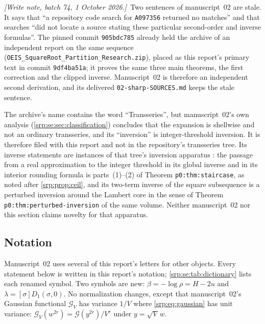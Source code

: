 \documentclass[11pt,a4paper]{article}
\numberwithin{equation}{section}
\theoremstyle{definition}
\theoremstyle{remark}
\newcommand{\G}{\mathcal G}
\newcommand{\writenotefour}[1]{\par\smallskip\noindent
 \textit{[Write note, batch 74, 1 October 2026.]}\ #1\par\smallskip}
\begin{document}
\writenotefour{Two sentences of manuscript~02 are stale. It says that ``a
repository code search for \texttt{A097356} returned no matches'' and
that searches ``did not locate a source stating these particular
second-order and inverse formulas''. The pinned commit
\texttt{905bdc785} already held the archive of an independent report on
the same sequence (\texttt{OEIS\_SquareRoot\_Partition\_Research.zip}),
placed as this report's primary text in commit \texttt{9df4ba51a}; it
proves the same three main theorems, the first correction and the clipped
inverse. Manuscript~02 is therefore an independent second derivation, and
its delivered \texttt{02-sharp-SOURCES.md} keeps the stale sentence.}

The archive's name contains the word ``Transseries'', but manuscript~02's
own analysis (\cref{srp:se:sec:classification}) concludes that the
expansion is shellwise and not an ordinary transseries, and its
``inversion'' is integer-threshold inversion. It is therefore filed with
this report and not in the repository's transseries tree. Its inverse
statements are instances of that tree's inversion apparatus
\cite{proveitTI}: the passage from a real approximation to the integer
threshold in its global inverse and in its interior rounding formula is
parts~(1)--(2) of Theorem \texttt{p0:thm:staircase}, as noted after
\cref{srp:prop:ceil}, and its two-term inverse of the square subsequence is
a perturbed inversion around the Lambert core in the sense of Theorem
\texttt{p0:thm:perturbed-inversion} of the same volume. Neither
manuscript~02 nor this section claims novelty for that apparatus.

\subsection{Notation}
\label{srp:se:sec:notation}

Manuscript~02 uses several of this report's letters for other objects.
Every statement below is written in this report's notation;
\cref{srp:se:tab:dictionary} lists each renamed symbol. Two symbols are
new: $\beta=-\log\rho=H-2u$ and $\lambda=[\sigma]D_1(\sigma,0)$. No
normalization changes, except that manuscript~02's Gaussian functional
$\mathcal G_V$ has variance $1/V$ where \eqref{srp:eq:gaussian} has unit
variance: $\mathcal G_V(w^{2r})=\G(y^{2r})/V^r$ under $y=\sqrt V\,w$.
\end{document}
